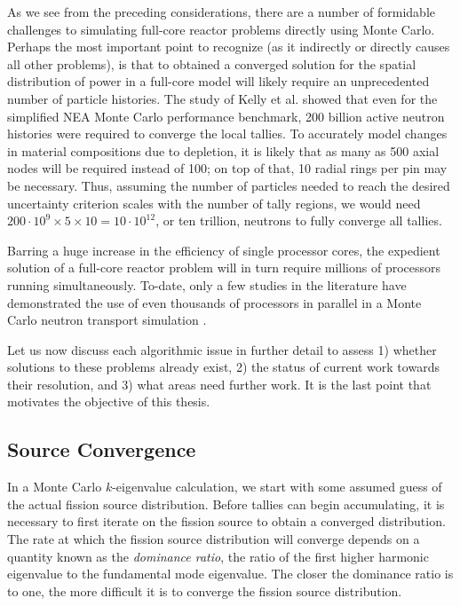 As we see from the preceding considerations, there are a number of formidable
challenges to simulating full-core reactor problems directly using Monte
Carlo. Perhaps the most important point to recognize (as it indirectly or
directly causes all other problems), is that to obtained a converged solution
for the spatial distribution of power in a full-core model will likely require
an unprecedented number of particle histories. The study of Kelly et
al. \cite{physor-kelly-2012} showed that even for the simplified NEA Monte Carlo
performance benchmark, 200 billion active neutron histories were required to
converge the local tallies. To accurately model changes in material compositions
due to depletion, it is likely that as many as 500 axial nodes will be required
instead of 100; on top of that, 10 radial rings per pin may be necessary. Thus,
assuming the number of particles needed to reach the desired uncertainty
criterion scales with the number of tally regions, we would need $200 \cdot 10^9
\times 5 \times 10 = 10 \cdot 10^{12}$, or ten trillion, neutrons to fully
converge all tallies.

Barring a huge increase in the efficiency of single processor cores, the
expedient solution of a full-core reactor problem will in turn require millions
of processors running simultaneously. To-date, only a few studies in the
literature have demonstrated the use of even thousands of processors in parallel
in a Monte Carlo neutron transport simulation \cite{lanl-brown-2005,
  ane-romano-2013}.

Let us now discuss each algorithmic issue in further detail to assess 1) whether
solutions to these problems already exist, 2) the status of current work towards
their resolution, and 3) what areas need further work. It is the last point that
motivates the objective of this thesis. 

\subsection{Source Convergence}

In a Monte Carlo $k$-eigenvalue calculation, we start with some assumed guess of
the actual fission source distribution. Before tallies can begin accumulating,
it is necessary to first iterate on the fission source to obtain a converged
distribution. The rate at which the fission source distribution will converge
depends on a quantity known as the \emph{dominance ratio}, the ratio of the
first higher harmonic eigenvalue to the fundamental mode eigenvalue. The closer
the dominance ratio is to one, the more difficult it is to converge the fission
source distribution.

